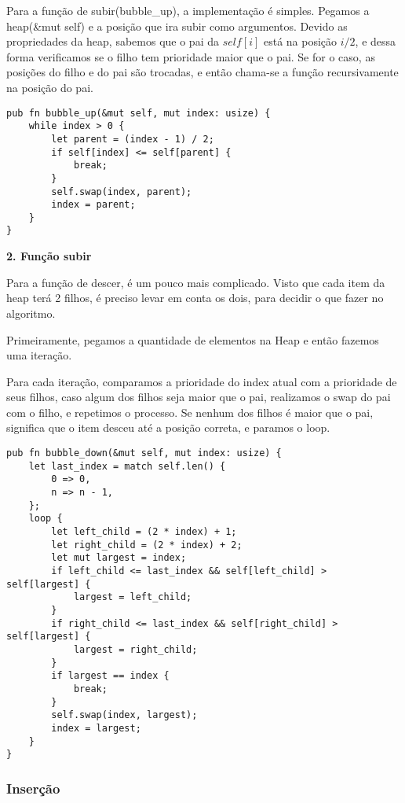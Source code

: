 \vspace{3mm}

Para a função de subir(bubble\_up), a implementação é simples.
Pegamos a heap(\&mut self) e a posição que ira subir como argumentos.
Devido as propriedades da heap, sabemos que o pai da $self[i]$ está na
posição $i/2$, e dessa forma verificamos se o filho tem prioridade maior que o pai.
Se for o caso, as posições do filho e do pai são trocadas,
e então chama-se a função recursivamente na posição do pai.


\begin{lstlisting}
pub fn bubble_up(&mut self, mut index: usize) {
    while index > 0 {
        let parent = (index - 1) / 2;
        if self[index] <= self[parent] {
            break;
        }
        self.swap(index, parent);
        index = parent;
    }
}
\end{lstlisting}

\vspace{3mm}

\textbf{2. Função subir} 

\vspace{3mm}

Para a função de descer, é um pouco mais complicado. Visto que cada item da heap terá 2 filhos,
é preciso levar em conta os dois, para decidir o que fazer no algoritmo.


Primeiramente, pegamos a quantidade de elementos na Heap e então fazemos uma iteração.

Para cada iteração, comparamos a prioridade do index atual com a prioridade de seus filhos,
caso algum dos filhos seja maior que o pai, realizamos o swap do pai com o filho, e
repetimos o processo.
Se nenhum dos filhos é maior que o pai, significa que o item desceu até a posição correta,
e paramos o loop.

\begin{lstlisting}
pub fn bubble_down(&mut self, mut index: usize) {
    let last_index = match self.len() {
        0 => 0,
        n => n - 1,
    };
    loop {
        let left_child = (2 * index) + 1;
        let right_child = (2 * index) + 2;
        let mut largest = index;
        if left_child <= last_index && self[left_child] > self[largest] {
            largest = left_child;
        }
        if right_child <= last_index && self[right_child] > self[largest] {
            largest = right_child;
        }
        if largest == index {
            break;
        }
        self.swap(index, largest);
        index = largest;
    }
}
\end{lstlisting}

\subsubsection{Inserção}
